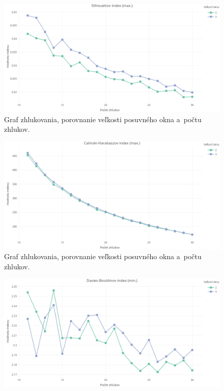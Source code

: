 \documentclass[a4paper,twoside,slovak,12pt,appendix]{article}
\begin{document}
\begin{appendices}
\begin{figure}[htbp]
  \centering
  \includegraphics[width=\textwidth]{cvi/dtw_basic_workdays_dense/201902271851-Sil-dtw_basic_workdays_dense.png}
  \caption{Graf zhlukovania, porovnanie veľkosti posuvného okna a~počtu zhlukov.}
\end{figure}
\begin{figure}[htbp]
  \centering
  \includegraphics[width=\textwidth]{cvi/dtw_basic_workdays_dense/201902271851-CH-dtw_basic_workdays_dense.png}
  \caption{Graf zhlukovania, porovnanie veľkosti posuvného okna a~počtu zhlukov.}
\end{figure}
\begin{figure}[htbp]
  \centering
  \includegraphics[width=\textwidth]{cvi/dtw_basic_workdays_dense/201902271851-DB-dtw_basic_workdays_dense.png}

\end{figure}
\end{appendices}
\end{document}
